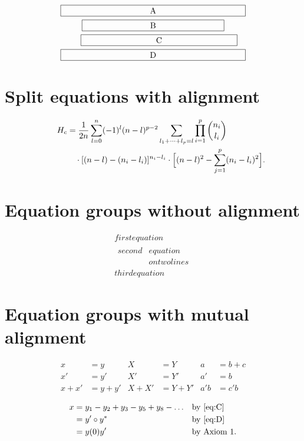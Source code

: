 \documentclass[oneside]{book}
\begin{document}
\begin{multline}
\framebox[.65\columnwidth]{A}\\
\framebox[.5\columnwidth]{B}\\
\shoveright{\framebox[.55\columnwidth]{C}}\\
\framebox[.65\columnwidth]{D}
\end{multline}

\section{Split equations with alignment}

\begin{equation}\label{e:barwq}\begin{split}
H_c&=\frac{1}{2n} \sum^n_{l=0}(-1)^{l}(n-{l})^{p-2}
  \sum_{l _1+\dots+ l _p=l}\prod^p_{i=1} \binom{n_i}{l _i}\\
&\quad\cdot[(n-l )-(n_i-l _i)]^{n_i-l _i}\cdot
  \Bigl[(n-l )^2-\sum^p_{j=1}(n_i-l _i)^2\Bigr].
  \kern-2em %
\end{split}\end{equation}

\section{Equation groups without alignment}

\begin{gather}
  first equation\\
  \begin{split}
    second & equation\\
           & on two lines
  \end{split}
  \\
  third equation
\end{gather}

\section{Equation groups with mutual alignment}

\begin{align}
x&=y       & X&=Y       & a&=b+c\\
x'&=y'     & X'&=Y'     & a'&=b\\
x+x'&=y+y' & X+X'&=Y+Y' & a'b&=c'b
\end{align}

\begin{align}
x& = y_1-y_2+y_3-y_5+y_8-\dots
                    && \text{by \eqref{eq:C}}\\
 & = y'\circ y^*    && \text{by \eqref{eq:D}}\\
 & = y(0) y'        && \text {by Axiom 1.}
\end{align}
\end{document}
